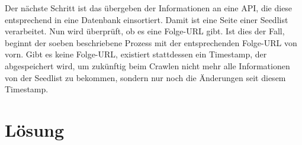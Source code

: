 Der nächste Schritt ist das übergeben der Informationen an eine \acs{API}, die diese entsprechend in eine Datenbank einsortiert. Damit ist eine Seite einer Seedlist verarbeitet. Nun wird überprüft, ob es eine Folge-\ac{URL} gibt. Ist dies der Fall, beginnt der soeben beschriebene Prozess mit der entsprechenden Folge-URL von vorn. Gibt es keine Folge-\ac{URL}, existiert stattdessen ein Timestamp, der abgespeichert wird, um zukünftig beim Crawlen nicht mehr alle Informationen von der Seedlist zu bekommen, sondern nur noch die Änderungen seit diesem Timestamp.

\newpage


\section{Lösung}
